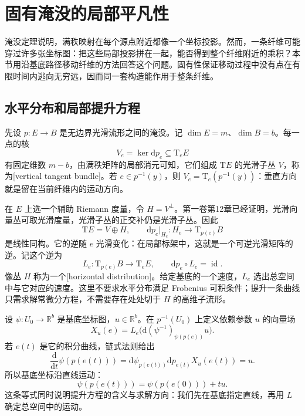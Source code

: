 
% 
% 
% 

\section{固有淹没的局部平凡性}
\label{g2:sec:1506}

淹没定理说明，满秩映射在每个源点附近都像一个坐标投影。然而，一条纤维可能穿过许多张坐标图：把这些局部投影拼在一起，能否得到整个纤维附近的乘积？本节用沿基底路径移动纤维的方法回答这个问题。固有性保证移动过程中没有点在有限时间内逃向无穷远，因而同一套构造能作用于整条纤维。

\subsection{水平分布和局部提升方程}
\label{g2:subsec:1506:01}

先设 \(p:E\to B\) 是无边界光滑流形之间的淹没。记 \(\dim E=m\)、\(\dim B=b\)。每一点的核
\[
	V_e=\ker\mathrm{d}p_e\subseteq\mathrm{T}_eE
\]
有固定维数 \(m-b\)，由满秩矩阵的局部消元可知，它们组成 \(\mathrm{T}E\) 的光滑子丛 \(V\)，称为[vertical tangent bundle]。若 \(e\in p^{-1}(y)\)，则 \(V_e=\mathrm{T}_e(p^{-1}(y))\)：垂直方向就是留在当前纤维内的运动方向。

在 \(E\) 上选一个辅助 Riemann 度量，令 \(H=V^\perp\)。第一卷第12章已经证明，光滑向量丛可取光滑度量，光滑子丛的正交补仍是光滑子丛。因此
\[
	\mathrm{T}E=V\oplus H,
	\qquad \mathrm{d}p_e|_{H_e}:H_e\longrightarrow\mathrm{T}_{p(e)}B
\]
是线性同构。它的逆随 \(e\) 光滑变化：在局部标架中，这就是一个可逆光滑矩阵的逆。记这个逆为
\begin{equation}\label{g2:eq:horizontal-right-inverse}
	L_e:\mathrm{T}_{p(e)}B\longrightarrow\mathrm{T}_eE,
	\qquad \mathrm{d}p_e\circ L_e=\operatorname{id}.
\end{equation}
像丛 \(H\) 称为一个[horizontal distribution]。给定基底的一个速度，\(L_e\) 选出总空间中与它对应的速度。这里不要求水平分布满足 Frobenius 可积条件；提升一条曲线只需求解常微分方程，不需要存在处处切于 \(H\) 的高维子流形。

\ProseParagraphBreak

设 \(\psi:U_0\to\mathbb R^b\) 是基底坐标图，\(u\in\mathbb R^b\)。在 \(p^{-1}(U_0)\) 上定义依赖参数 \(u\) 的向量场
\begin{equation}\label{g2:eq:radial-horizontal-field}
	X_u(e)=L_e\bigl(\mathrm{d}(\psi^{-1})_{\psi(p(e))}u\bigr).
\end{equation}
若 \(e(t)\) 是它的积分曲线，链式法则给出
\[
	\frac{\mathrm{d}}{\mathrm{d}t}\psi(p(e(t)))
	=\mathrm{d}\psi_{p(e(t))}\mathrm{d}p_{e(t)}X_u(e(t))=u.
\]
所以基底坐标沿直线运动：
\begin{equation}\label{g2:eq:horizontal-base-line}
	\psi(p(e(t)))=\psi(p(e(0)))+tu.
\end{equation}
这条等式同时说明提升方程的含义与求解方向：我们先在基底指定直线，再用 \(L\) 确定总空间中的运动。

